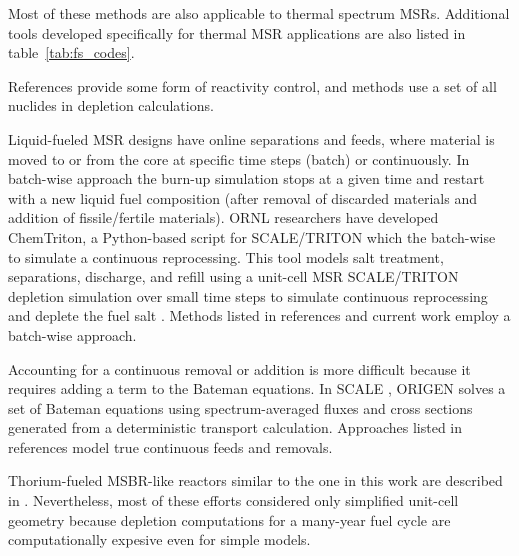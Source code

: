 Most of these methods are also applicable to thermal spectrum \glspl{MSR}. 
Additional tools developed specifically for thermal \gls{MSR} applications are 
also listed in table~\ref{tab:fs_codes}.

References 
\cite{doligez_coupled_2014,heuer_towards_2014,sheu_depletion_2013,aufiero_extended_2013} 
provide some form of reactivity control, and methods 
\cite{doligez_coupled_2014,heuer_towards_2014,aufiero_extended_2013,ahmad_neutronics_2015, 
park_whole_2015, 
jeong_equilibrium_2016,rykhlevskii_online_2017,nuttin_potential_2005} use a set 
of all nuclides in depletion calculations. 

Liquid-fueled \gls{MSR} designs have online separations and feeds, where 
material is moved to or from the core at specific time steps (batch) or 
continuously. In batch-wise approach the burn-up simulation stops at a given 
time and restart with a new liquid fuel composition (after removal of discarded 
materials and addition of fissile/fertile materials). \gls{ORNL} researchers 
have developed ChemTriton, a Python-based script for SCALE/TRITON which the 
batch-wise to simulate a continuous reprocessing. This tool models salt 
treatment, separations, discharge, and refill using a unit-cell \gls{MSR} 
SCALE/TRITON depletion simulation over small time steps to simulate continuous 
reprocessing and deplete the fuel salt \cite{powers_new_2013}. Methods listed in 
references \cite{fiorina_investigation_2013,sheu_depletion_2013,park_whole_2015, 
jeong_equilibrium_2016,powers_inventory_2014,betzler_molten_2017,rykhlevskii_online_2017} 
and current work employ a batch-wise approach.

Accounting for a continuous removal or addition is more difficult because it 
requires adding a term to the Bateman equations. In SCALE 
\cite{bowman_scale_2011}, ORIGEN \cite{gauld_isotopic_2011} solves a set of 
Bateman equations using spectrum-averaged fluxes and cross sections generated 
from a deterministic transport calculation. Approaches listed in references 
\cite{doligez_coupled_2014,heuer_towards_2014,aufiero_extended_2013,nuttin_potential_2005} 
model true continuous feeds and removals. 

Thorium-fueled \gls{MSBR}-like reactors similar to the one in this work are 
described in \cite{park_whole_2015, 
jeong_equilibrium_2016,powers_new_2013,powers_inventory_2014, 
betzler_molten_2017,rykhlevskii_online_2017,nuttin_potential_2005}. 
Nevertheless, most of these efforts considered only simplified unit-cell 
geometry because depletion computations for a many-year fuel cycle are 
computationally expesive even for simple models. 

